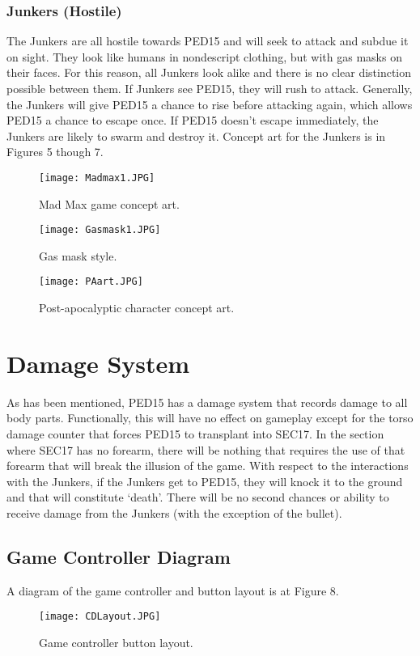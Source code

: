 \documentclass[journal]{IEEEtran}
\begin{document}
\subsubsection{Junkers (Hostile)}
The Junkers are all hostile towards PED15 and will seek to attack and subdue it on sight. They look like humans in nondescript clothing, but with gas masks on their faces. For this reason, all Junkers look alike and there is no clear distinction possible between them. If Junkers see PED15, they will rush to attack. Generally, the Junkers will give PED15 a chance to rise before attacking again, which allows PED15 a chance to escape once. If PED15 doesn't escape immediately, the Junkers are likely to swarm and destroy it. Concept art for the Junkers is in Figures 5 though 7.
	\begin{figure}[h]
		\hfill\texttt{[image: Madmax1.JPG]}\hspace*{\fill}
		\caption{Mad Max game concept art.}
	\end{figure}
	\begin{figure}[h]
		\hfill\texttt{[image: Gasmask1.JPG]}\hspace*{\fill}
		\caption{Gas mask style.}
	\end{figure}
	\begin{figure}[h]
		\hfill\texttt{[image: PAart.JPG]}\hspace*{\fill}
		\caption{Post-apocalyptic character concept art.}
	\end{figure}
\section{Damage System}
As has been mentioned, PED15 has a damage system that records damage to all body parts. Functionally, this will have no effect on gameplay except for the torso damage counter that forces PED15 to transplant into SEC17. In the section where SEC17 has no forearm, there will be nothing that requires the use of that forearm that will break the illusion of the game.
\linebreak\linebreak
With respect to the interactions with the Junkers, if the Junkers get to PED15, they will knock it to the ground and that will constitute `death'. There will be no second chances or ability to receive damage from the Junkers (with the exception of the bullet).
\subsection{Game Controller Diagram}
A diagram of the game controller and button layout is at Figure 8.
	\begin{figure}[h]
		\hfill\texttt{[image: CDLayout.JPG]}\hspace*{\fill}
		\caption{Game controller button layout.}
	\end{figure}
\end{document}
